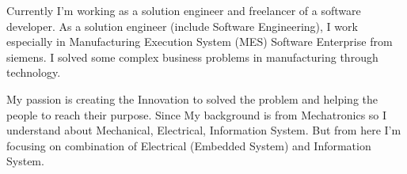 

\begin{cvparagraph}

Currently I'm working as a solution engineer and freelancer of a software developer. As a solution engineer (include Software Engineering), I work especially in Manufacturing Execution System (MES) Software Enterprise from siemens. I solved some complex business problems in manufacturing through technology.

My passion is creating the Innovation to solved the problem and helping the people to reach their purpose. Since My background is from Mechatronics so I understand about Mechanical, Electrical, Information System. But from here I'm focusing on combination of Electrical (Embedded System) and Information System.
\end{cvparagraph}
